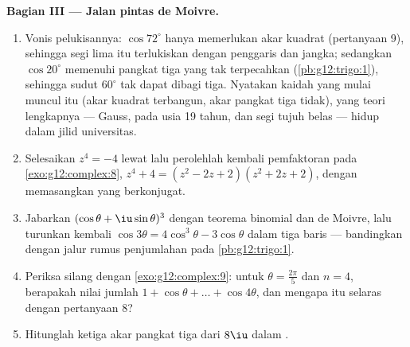 \begin{problem}
\medskip
\noindent\textbf{Bagian III --- Jalan pintas de Moivre.}
\begin{enumerate}[resume]
  \item Vonis pelukisannya: $\cos 72^\circ$ hanya memerlukan
        akar kuadrat (pertanyaan 9), sehingga segi lima itu
        terlukiskan dengan penggaris dan jangka; sedangkan $\cos 20^\circ$
        memenuhi  pangkat tiga yang tak terpecahkan
        (\cref{pb:g12:trigo:1}), sehingga sudut $60^\circ$ tak dapat
        dibagi tiga. Nyatakan kaidah yang mulai muncul itu (akar
        kuadrat terbangun, akar pangkat tiga tidak), yang teori lengkapnya ---
        Gauss, pada usia 19 tahun, dan segi tujuh belas --- hidup dalam
        jilid universitas.
  \item Selesaikan $z^4 = -4$ lewat  lalu perolehlah kembali
        pemfaktoran pada \cref{exo:g12:complex:8},
        $z^4 + 4 = (z^2 - 2z + 2)(z^2 + 2z + 2)$, dengan memasangkan
         yang berkonjugat.
  \item Jabarkan $(\cos\theta + \iu\sin\theta)^3$ dengan
        teorema binomial dan de Moivre, lalu turunkan kembali
        $\cos 3\theta = 4\cos^3\theta - 3\cos\theta$ dalam tiga
        baris --- bandingkan dengan jalur rumus penjumlahan pada
        \cref{pb:g12:trigo:1}.
  \item Periksa silang dengan \cref{exo:g12:complex:9}: untuk
        $\theta = \frac{2\pi}{5}$ dan $n = 4$, berapakah nilai
        jumlah $1 + \cos\theta + \dots + \cos 4\theta$, dan
        mengapa itu selaras dengan pertanyaan 8?
  \item Hitunglah ketiga akar pangkat tiga dari $8\iu$ dalam .
\end{enumerate}


\end{problem}
